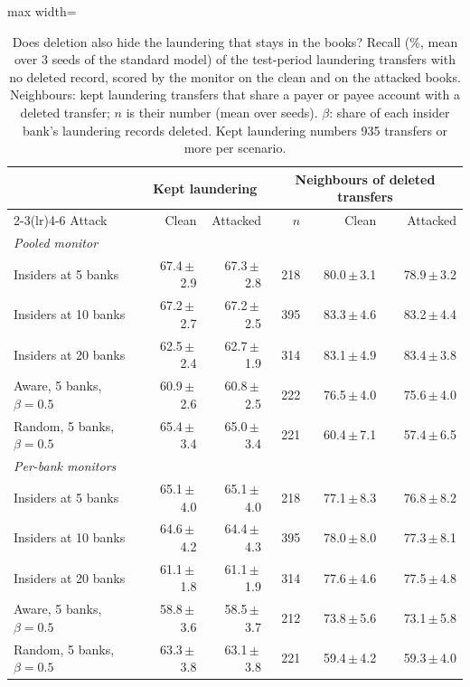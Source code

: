 \begin{table}[!htbp]\centering\small
\caption{Does deletion also hide the laundering that stays in the books? Recall (\%, mean over 3 seeds of the standard model) of the test-period laundering transfers with no deleted record, scored by the monitor on the clean and on the attacked books. Neighbours: kept laundering transfers that share a payer or payee account with a deleted transfer; $n$ is their number (mean over seeds). $\beta$: share of each insider bank's laundering records deleted. Kept laundering numbers 935 transfers or more per scenario.}\label{tab:spill}
\begin{adjustbox}{max width=\linewidth}\begin{tabular}{lrrrrr}\toprule
 & \multicolumn{2}{c}{Kept laundering} & \multicolumn{3}{c}{Neighbours of deleted transfers} \\\cmidrule(lr){2-3}\cmidrule(lr){4-6}
Attack & Clean & Attacked & $n$ & Clean & Attacked \\\midrule
\multicolumn{6}{l}{\emph{Pooled monitor}} \\
Insiders at 5 banks & 67.4\,$\pm$\,2.9 & 67.3\,$\pm$\,2.8 & 218 & 80.0\,$\pm$\,3.1 & 78.9\,$\pm$\,3.2 \\
Insiders at 10 banks & 67.2\,$\pm$\,2.7 & 67.2\,$\pm$\,2.5 & 395 & 83.3\,$\pm$\,4.6 & 83.2\,$\pm$\,4.4 \\
Insiders at 20 banks & 62.5\,$\pm$\,2.4 & 62.7\,$\pm$\,1.9 & 314 & 83.1\,$\pm$\,4.9 & 83.4\,$\pm$\,3.8 \\
Aware, 5 banks, $\beta=0.5$ & 60.9\,$\pm$\,2.6 & 60.8\,$\pm$\,2.5 & 222 & 76.5\,$\pm$\,4.0 & 75.6\,$\pm$\,4.0 \\
Random, 5 banks, $\beta=0.5$ & 65.4\,$\pm$\,3.4 & 65.0\,$\pm$\,3.4 & 221 & 60.4\,$\pm$\,7.1 & 57.4\,$\pm$\,6.5 \\
\multicolumn{6}{l}{\emph{Per-bank monitors}} \\
Insiders at 5 banks & 65.1\,$\pm$\,4.0 & 65.1\,$\pm$\,4.0 & 218 & 77.1\,$\pm$\,8.3 & 76.8\,$\pm$\,8.2 \\
Insiders at 10 banks & 64.6\,$\pm$\,4.2 & 64.4\,$\pm$\,4.3 & 395 & 78.0\,$\pm$\,8.0 & 77.3\,$\pm$\,8.1 \\
Insiders at 20 banks & 61.1\,$\pm$\,1.8 & 61.1\,$\pm$\,1.9 & 314 & 77.6\,$\pm$\,4.6 & 77.5\,$\pm$\,4.8 \\
Aware, 5 banks, $\beta=0.5$ & 58.8\,$\pm$\,3.6 & 58.5\,$\pm$\,3.7 & 212 & 73.8\,$\pm$\,5.6 & 73.1\,$\pm$\,5.8 \\
Random, 5 banks, $\beta=0.5$ & 63.3\,$\pm$\,3.8 & 63.1\,$\pm$\,3.8 & 221 & 59.4\,$\pm$\,4.2 & 59.3\,$\pm$\,4.0 \\
\bottomrule\end{tabular}\end{adjustbox}\end{table}